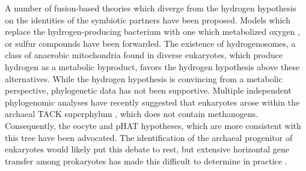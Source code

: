 \documentclass[12pt,twoside]{reedthesis}
\begin{document}
A number of fusion-based theories which diverge from the hydrogen hypothesis on the identities of the symbiotic partners have been proposed.
Models which replace the hydrogen-producing bacterium with one which metabolized oxygen \citep{vellai_origin_1999}, or sulfur compounds \citep{searcy_origins_1992} have been forwarded.
The existence of hydrogenosomes, a class of anaerobic mitochondria found in diverse eukaryotes, which produce hydrogen as a metabolic byproduct, favors the hydrogen hypothesis above these alternatives.
While the hydrogen hypothesis is convincing from a metabolic perspective, phylogenetic data has not been supportive.
Multiple independent phylogenomic analyses have recently suggested that eukaryotes arose within the archaeal TACK superphylum \citep{guy_archaeal_2011, williams_congruent_2012, guy_archaeal_2014}, which does not contain methanogens.
Consequently, the eocyte \citep{lake_eocytes:_1984, cox_archaebacterial_2008} and pHAT \citep{martijn_archaeon_2013} hypotheses, which are more consistent with this tree have been advocated.
The identification of the archaeal progenitor of eukaryotes would likely put this debate to rest, but extensive horizontal gene transfer among prokaryotes has made this difficult to determine in practice \citep{archibald_endosymbiosis_2015}.

\end{document}
